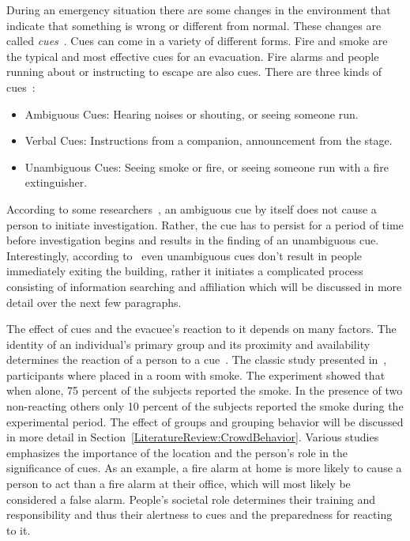 During an emergency situation there are some changes in the environment that indicate that something is wrong or different from normal. These changes are called \emph{cues}~\cite{Sime:1983uy}. Cues can come in a variety of different forms. Fire and smoke are the typical and most effective cues for an evacuation. Fire alarms and people running about or instructing to escape are also cues. There are three kinds of cues~\cite{Sime:1983uy}:
\begin{itemize}
\item Ambiguous Cues: Hearing noises or shouting, or seeing someone run.
\item Verbal Cues: Instructions from a companion, announcement from the stage.
\item Unambiguous Cues: Seeing smoke or fire, or seeing someone run with a fire extinguisher.
\end{itemize}
According to some researchers~\cite{Ramachandran:1990wj,Proulx:2007ul}, an ambiguous cue by itself does not cause a person to initiate investigation. Rather, the cue has to persist for a period of time before investigation begins and results in the finding of an unambiguous cue. Interestingly, according to~\cite{Tong:1985wn} even unambiguous cues don't result in people immediately exiting the building, rather it initiates a complicated process consisting of information searching and affiliation which will be discussed in more detail over the next few paragraphs.

The effect of cues and the evacuee's reaction to it depends on many factors. The identity of an individual's primary group and its proximity and availability determines the reaction of a person to a cue~\cite{Sime:1983uy}. The classic study presented in~\cite{Latane:1969wm}, participants where placed in a room with smoke. The experiment showed that when alone, 75 percent of the subjects reported the smoke. In the presence of two non-reacting others only 10 percent of the subjects reported the smoke during the experimental period. The effect of groups and grouping behavior will be discussed in more detail in Section~\ref{LiteratureReview:CrowdBehavior}. Various studies~\cite{Proulx:2003tc,Proulx:2001we,Paulsen:1984ti,Sandberg:1997tw,Cocking:2008vv,Tong:1985wn} emphasizes the importance of the location and the person's role in the significance of cues. As an example, a fire alarm at home is more likely to cause a person to act than a fire alarm at their office, which will most likely be considered a false alarm. People's societal role determines their training and responsibility and thus their alertness to cues and the preparedness for reacting to it.

